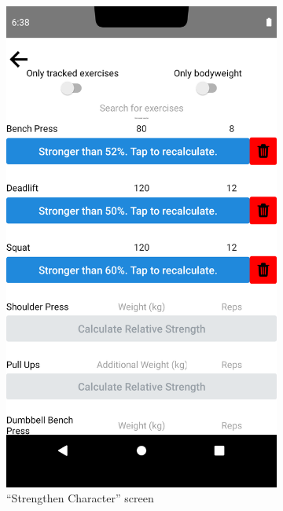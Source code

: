 \documentclass{l4proj}
\begin{document}
\begin{figure}[H]
    \begin{subfigure}{0.45\textwidth}
        \includegraphics[width=\textwidth]{exercise_modal.png}
        \caption{``Strengthen Character'' screen} 
    \end{subfigure}
    \begin{subfigure}{0.45\textwidth}

\end{subfigure}
\end{figure}
\end{document}
